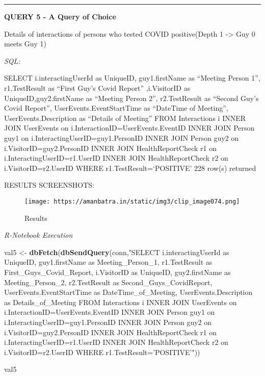 \documentclass[
]{article}
\newenvironment{Shaded}{\begin{snugshade}}{\end{snugshade}}
\newcommand{\KeywordTok}[1]{\textcolor[rgb]{0.13,0.29,0.53}{\textbf{#1}}}
\newcommand{\NormalTok}[1]{#1}
\newcommand{\StringTok}[1]{\textcolor[rgb]{0.31,0.60,0.02}{#1}}
\begin{document}
\begin{center}\rule{0.5\linewidth}{0.5pt}\end{center}

\textbf{QUERY 5 - A Query of Choice}

Details of interactions of persons who tested COVID positive(Depth 1
-\textgreater{} Guy 0 meets Guy 1)

\emph{SQL:}

SELECT i.interactingUserId as UniqueID, guy1.firstName as ``Meeting
Person 1'', r1.TestResult as ``First Guy's Covid Report'' ,i.VisitorID
as UniqueID,guy2.firstName as ``Meeting Person 2'', r2.TestResult as
``Second Guy's Covid Report'', UserEvents.EventStartTime as ``DateTime
of Meeting'', UserEvents.Description as ``Details of Meeting'' FROM
Interactions i INNER JOIN UserEvents on
i.InteractionID=UserEvents.EventID INNER JOIN Person guy1 on
i.InteractingUserID=guy1.PersonID INNER JOIN Person guy2 on
i.VisitorID=guy2.PersonID INNER JOIN HealthReportCheck r1 on
i.InteractingUserID=r1.UserID INNER JOIN HealthReportCheck r2 on
i.VisitorID=r2.UserID WHERE r1.TestResult=`POSITIVE' 228 row(s) returned

RESULTS SCREENSHOTS:

\begin{figure}
\centering
\texttt{[image: https://amanbatra.in/static/img3/clip\_image074.png]}
\caption{Results}
\end{figure}

\emph{R-Notebook Execution}

\begin{Shaded}
\begin{Highlighting}[]
\NormalTok{val5 <-}\StringTok{ }\KeywordTok{dbFetch}\NormalTok{(}\KeywordTok{dbSendQuery}\NormalTok{(conn,}\StringTok{"SELECT i.interactingUserId as UniqueID,}
\StringTok{guy1.firstName as Meeting_Person_1, r1.TestResult as First_Guys_Covid_Report,}
\StringTok{i.VisitorID as UniqueID, guy2.firstName as Meeting_Person_2, }
\StringTok{r2.TestResult as Second_Guys_CovidReport, }
\StringTok{UserEvents.EventStartTime as DateTime_of_Meeting, UserEvents.Description as Details_of_Meeting}
\StringTok{ FROM Interactions i}
\StringTok{INNER JOIN UserEvents on i.InteractionID=UserEvents.EventID}
\StringTok{INNER JOIN Person guy1 on i.InteractingUserID=guy1.PersonID}
\StringTok{INNER JOIN Person guy2 on i.VisitorID=guy2.PersonID}
\StringTok{INNER JOIN HealthReportCheck r1 on i.InteractingUserID=r1.UserID}
\StringTok{INNER JOIN HealthReportCheck r2 on i.VisitorID=r2.UserID}
\StringTok{WHERE r1.TestResult='POSITIVE'"}\NormalTok{))}

\NormalTok{val5}
\end{Highlighting}
\end{Shaded}
\end{document}
